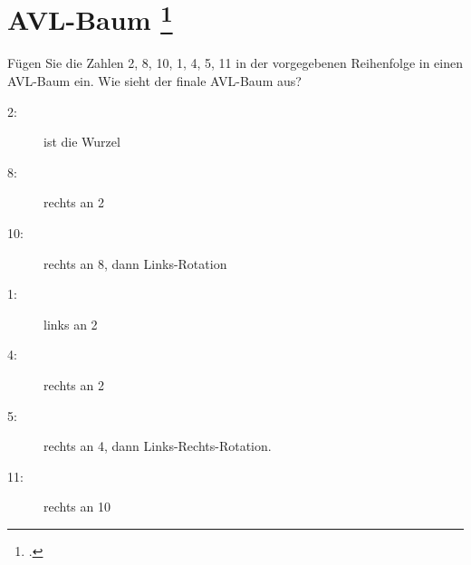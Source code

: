 \documentclass{lehramt-informatik-aufgabe}
\begin{document}

\section{AVL-Baum
\footcite{aud:e-klausur}}

Fügen Sie die Zahlen 2, 8, 10, 1, 4, 5, 11 in der vorgegebenen
Reihenfolge in einen AVL-Baum ein. Wie sieht der finale AVL-Baum aus?

\begin{liAntwort}
\begin{description}
\item[2:] ist die Wurzel
\item[8:] rechts an 2
\item[10:] rechts an 8, dann Links-Rotation
\item[1:] links an 2
\item[4:] rechts an 2
\item[5:] rechts an 4, dann Links-Rechts-Rotation.
\item[11:] rechts an 10
\end{description}

\end{liAntwort}
\end{document}
